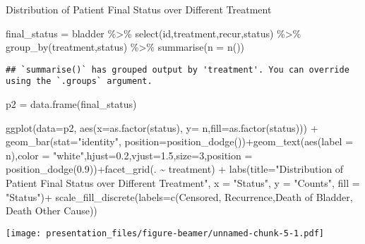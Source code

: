 \documentclass[
  ignorenonframetext,
]{beamer}
\newenvironment{Shaded}{\begin{snugshade}}{\end{snugshade}}
\newcommand{\AttributeTok}[1]{\textcolor[rgb]{0.77,0.63,0.00}{#1}}
\newcommand{\DecValTok}[1]{\textcolor[rgb]{0.00,0.00,0.81}{#1}}
\newcommand{\FloatTok}[1]{\textcolor[rgb]{0.00,0.00,0.81}{#1}}
\newcommand{\FunctionTok}[1]{\textcolor[rgb]{0.00,0.00,0.00}{#1}}
\newcommand{\NormalTok}[1]{#1}
\newcommand{\OtherTok}[1]{\textcolor[rgb]{0.56,0.35,0.01}{#1}}
\newcommand{\SpecialCharTok}[1]{\textcolor[rgb]{0.00,0.00,0.00}{#1}}
\newcommand{\StringTok}[1]{\textcolor[rgb]{0.31,0.60,0.02}{#1}}
\begin{document}
\begin{frame}[fragile]{Distribution of Patient Final Status over
Different Treatment}
\protect\hypertarget{distribution-of-patient-final-status-over-different-treatment}{}
\begin{Shaded}
\begin{Highlighting}[]
\NormalTok{final\_status }\OtherTok{=}\NormalTok{ bladder }\SpecialCharTok{\%\textgreater{}\%}  
  \FunctionTok{select}\NormalTok{(id,treatment,recur,status) }\SpecialCharTok{\%\textgreater{}\%} 
  \FunctionTok{group\_by}\NormalTok{(treatment,status) }\SpecialCharTok{\%\textgreater{}\%} \FunctionTok{summarise}\NormalTok{(}\AttributeTok{n =} \FunctionTok{n}\NormalTok{())}
\end{Highlighting}
\end{Shaded}

\begin{verbatim}
## `summarise()` has grouped output by 'treatment'. You can override using the `.groups` argument.
\end{verbatim}

\begin{Shaded}
\begin{Highlighting}[]
\NormalTok{p2 }\OtherTok{=} \FunctionTok{data.frame}\NormalTok{(final\_status)}

\FunctionTok{ggplot}\NormalTok{(}\AttributeTok{data=}\NormalTok{p2, }\FunctionTok{aes}\NormalTok{(}\AttributeTok{x=}\FunctionTok{as.factor}\NormalTok{(status), }\AttributeTok{y=}\NormalTok{ n,}\AttributeTok{fill=}\FunctionTok{as.factor}\NormalTok{(status))) }\SpecialCharTok{+} \FunctionTok{geom\_bar}\NormalTok{(}\AttributeTok{stat=}\StringTok{"identity"}\NormalTok{, }\AttributeTok{position=}\FunctionTok{position\_dodge}\NormalTok{())}\SpecialCharTok{+}\FunctionTok{geom\_text}\NormalTok{(}\FunctionTok{aes}\NormalTok{(}\AttributeTok{label =}\NormalTok{ n),}\AttributeTok{color =} \StringTok{"white"}\NormalTok{,}\AttributeTok{hjust=}\FloatTok{0.2}\NormalTok{,}\AttributeTok{vjust=}\FloatTok{1.5}\NormalTok{,}\AttributeTok{size=}\DecValTok{3}\NormalTok{,}\AttributeTok{position =} \FunctionTok{position\_dodge}\NormalTok{(}\FloatTok{0.9}\NormalTok{))}\SpecialCharTok{+}\FunctionTok{facet\_grid}\NormalTok{(. }\SpecialCharTok{\textasciitilde{}}\NormalTok{ treatment) }\SpecialCharTok{+} \FunctionTok{labs}\NormalTok{(}\AttributeTok{title=}\StringTok{"Distribution of Patient Final Status over Different Treatment"}\NormalTok{, }\AttributeTok{x =} \StringTok{"Status"}\NormalTok{, }\AttributeTok{y =} \StringTok{"Counts"}\NormalTok{, }\AttributeTok{fill =} \StringTok{"Status"}\NormalTok{)}\SpecialCharTok{+} \FunctionTok{scale\_fill\_discrete}\NormalTok{(}\AttributeTok{labels=}\FunctionTok{c}\NormalTok{(}\StringTok{\textquotesingle{}Censored\textquotesingle{}}\NormalTok{, }\StringTok{\textquotesingle{}Recurrence\textquotesingle{}}\NormalTok{,}\StringTok{\textquotesingle{}Death of Bladder\textquotesingle{}}\NormalTok{, }\StringTok{\textquotesingle{}Death Other Cause\textquotesingle{}}\NormalTok{))}
\end{Highlighting}
\end{Shaded}

\texttt{[image: presentation\_files/figure-beamer/unnamed-chunk-5-1.pdf]}
\end{frame}
\end{document}

